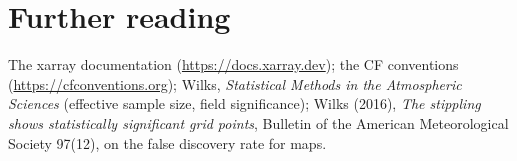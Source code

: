 \section{Further reading}
The xarray documentation (\url{https://docs.xarray.dev}); the CF conventions (\url{https://cfconventions.org}); Wilks, \emph{Statistical Methods in the Atmospheric Sciences} (effective sample size, field significance); Wilks (2016), \emph{The stippling shows statistically significant grid points}, Bulletin of the American Meteorological Society 97(12), on the false discovery rate for maps.

